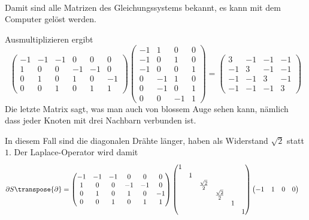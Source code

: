 \begin{loesung}
\begin{teilaufgaben}
\begin{align*}
\end{align*}
Damit sind alle Matrizen des Gleichungssystems bekannt, es kann mit
dem Computer gelöst werden.
\item Ausmultiplizieren ergibt
\[
\begin{pmatrix}
-1&-1&-1& 0& 0& 0\\
 1& 0& 0&-1&-1& 0\\
 0& 1& 0& 1& 0&-1\\
 0& 0& 1& 0& 1& 1
\end{pmatrix}
\begin{pmatrix}
  -1&  1&  0&  0\\
  -1&  0&  1&  0\\
  -1&  0&  0&  1\\
   0& -1&  1&  0\\
   0& -1&  0&  1\\
   0&  0& -1&  1
\end{pmatrix}
=\begin{pmatrix}
   3& -1& -1& -1\\
  -1&  3& -1& -1\\
  -1& -1&  3& -1\\
  -1& -1& -1&  3
\end{pmatrix}
\]
Die letzte Matrix sagt, was man auch von blossem Auge sehen kann,
nämlich dass jeder Knoten mit drei Nachbarn verbunden ist.
\item In diesem Fall sind die diagonalen Drähte länger, haben
als Widerstand $\sqrt{2}$ statt $1$. Der Laplace-Operator wird 
damit
\begin{align*}
\partial S\transpose{\partial}
&=
\begin{pmatrix}
-1&-1&-1& 0& 0& 0\\
 1& 0& 0&-1&-1& 0\\
 0& 1& 0& 1& 0&-1\\
 0& 0& 1& 0& 1& 1
\end{pmatrix}
\begin{pmatrix}
1& &                &                & & \\
 &1&                &                & & \\
 & &\frac{\sqrt{2}}2&                & & \\
 & &                &\frac{\sqrt{2}}2& & \\
 & &                &                &1& \\
 & &                &                & &1
\end{pmatrix}
\begin{pmatrix}
  -1&  1&  0&  0\\

\end{pmatrix}
\end{align*}
\end{teilaufgaben}
\end{loesung}
